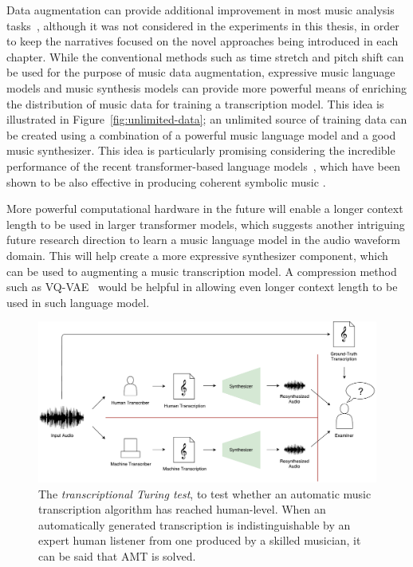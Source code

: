 Data augmentation can provide additional improvement in most music analysis tasks~\cite{mcfee2015muda}, although it was not considered in the experiments in this thesis, in order to keep the narratives focused on the novel approaches being introduced in each chapter.
While the conventional methods such as time stretch and pitch shift can be used for the purpose of music data augmentation, expressive music language models and music synthesis models can provide more powerful means of enriching the distribution of music data for training a transcription model.
This idea is illustrated in Figure~\ref{fig:unlimited-data}; an unlimited source of training data can be created using a combination of a powerful music language model and a good music synthesizer.
This idea is particularly promising considering the incredible performance of the recent transformer-based language models~\cite{vaswani2017attention}, which have been shown to be also effective in producing coherent symbolic music \cite{huang2019transformer}.

More powerful computational hardware in the future will enable a longer context length to be used in larger transformer models, which suggests another intriguing future research direction to learn a music language model in the audio waveform domain.
This will help create a more expressive synthesizer component, which can be used to augmenting a music transcription model.
A compression method such as VQ-VAE~\cite{oord2017vqvae} would be helpful in allowing even longer context length to be used in such language model.

\begin{figure}[b!]
	\includegraphics[width=\textwidth]{turing.pdf}
	\caption{The \emph{transcriptional Turing test}, to test whether an automatic music transcription algorithm has reached human-level. When an automatically generated transcription is indistinguishable by an expert human listener from one produced by a skilled musician, it can be said that AMT is solved.}
	\label{fig:turing}
\end{figure}


